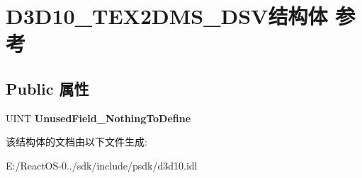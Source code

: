 \hypertarget{struct_d3_d10___t_e_x2_d_m_s___d_s_v}{}\section{D3\+D10\+\_\+\+T\+E\+X2\+D\+M\+S\+\_\+\+D\+S\+V结构体 参考}
\label{struct_d3_d10___t_e_x2_d_m_s___d_s_v}
\subsection*{Public 属性}
\begin{DoxyCompactItemize}
\item 
\mbox{\label{struct_d3_d10___t_e_x2_d_m_s___d_s_v_addb7aee21c347fa04ae3973857b2d742}} 
U\+I\+NT {\bfseries Unused\+Field\+\_\+\+Nothing\+To\+Define}
\end{DoxyCompactItemize}


该结构体的文档由以下文件生成\+:\begin{DoxyCompactItemize}
\item 
E\+:/\+React\+O\+S-\/0../sdk/include/psdk/d3d10.\+idl\end{DoxyCompactItemize}
